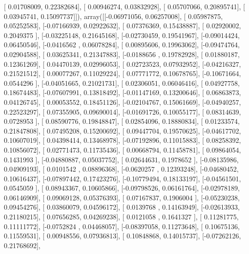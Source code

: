 \documentclass{article}
\begin{document}
       [ 0.01708009,  0.22382684],
       [ 0.00946274,  0.03832928],
       [ 0.05707066,  0.20895741],
       [ 0.03945741,  0.15097737]]), array([[-0.06971056,  0.06257008],
       [ 0.05987875,  0.05252583],
       [-0.07166939,  0.02922632],
       [ 0.07376369,  0.15438887],
       [ 0.02920002,  0.2049375 ],
       [-0.03225148,  0.21645168],
       [-0.02730459,  0.19541967],
       [-0.09014424,  0.06450546],
       [-0.0416562 ,  0.06078284],
       [ 0.00895606,  0.19963062],
       [-0.09474764,  0.02904588],
       [ 0.03625341,  0.21347883],
       [-0.0188656 ,  0.19782928],
       [ 0.01880187,  0.12361269],
       [ 0.04470139,  0.02996053],
       [ 0.02723523,  0.07932952],
       [-0.04216327,  0.21521512],
       [ 0.00077267,  0.11029224],
       [ 0.07771772,  0.10678765],
       [-0.10671664,  0.0544296 ],
       [-0.04051665,  0.21021731],
       [ 0.02306051,  0.06046416],
       [ 0.04927758,  0.18674483],
       [-0.07607991,  0.13818492],
       [-0.01147169,  0.13200646],
       [ 0.06863873,  0.04126745],
       [ 0.00053552,  0.18451126],
       [-0.02104767,  0.15061669],
       [-0.04940257,  0.22523297],
       [ 0.07355905,  0.09690014],
       [-0.01691726,  0.10055177],
       [ 0.08314639,  0.0728953 ],
       [ 0.08590776,  0.19848847],
       [ 0.02854096,  0.18880834],
       [ 0.01233574,  0.21847808],
       [ 0.07495208,  0.15200692],
       [ 0.09447704,  0.19570625],
       [-0.04617702,  0.10607019],
       [ 0.04398414,  0.13468978],
       [-0.07192896,  0.11015883],
       [ 0.08258392,  0.10856072],
       [ 0.02771473,  0.11735436],
       [ 0.00668794,  0.11458781],
       [ 0.09864054,  0.1431993 ],
       [-0.04880887,  0.05037752],
       [ 0.02644631,  0.1978652 ],
       [-0.08135986,  0.04909193],
       [ 0.0101542 ,  0.08896368],
       [-0.0620257 ,  0.12393248],
       [-0.04680452,  0.10616437],
       [-0.07897442,  0.17423276],
       [-0.10779494,  0.18133197],
       [-0.04561501,  0.0545059 ],
       [ 0.08943367,  0.10605866],
       [-0.09798526,  0.06161764],
       [-0.02978189,  0.06146909],
       [ 0.09069128,  0.05376393],
       [ 0.07167837,  0.1906004 ],
       [-0.05230238,  0.09454276],
       [ 0.03860079,  0.04596172],
       [ 0.0139768 ,  0.14163949],
       [-0.02613933,  0.21180215],
       [ 0.07656285,  0.04269238],
       [ 0.0121058 ,  0.1641327 ],
       [ 0.11281775,  0.11111772],
       [-0.0752824 ,  0.04468057],
       [-0.08397058,  0.11273648],
       [ 0.10675136,  0.11559531],
       [ 0.00948556,  0.07936813],
       [ 0.10848868,  0.14015737],
       [-0.07262126,  0.21768692],
\end{document}
